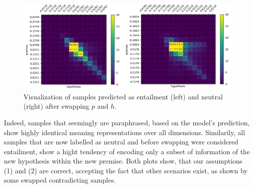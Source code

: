 \begin{figure}[tph!]	\centering
\includegraphics[totalheight=7cm]{fig/alignment_entailment_inversed.png}
	\caption{Visualization of samples predicted as entailment (left) and neutral (right) after swapping $p$ and $h$.}
	\label{fig:alignment_entailment_inversed}
\end{figure}
Indeed, samples that seemingly are paraphrased, based on the model's prediction, show highly identical meaning representations over all dimensions. Similarily, all samples that are now labelled as neutral and before swapping were considered entailment, show a hight tendency of encoding only a subset of information of the new hypothesis within the new premise. Both plots show, that our assumptions (1) and (2) are correct, accepting the fact that other scenarios exist, as shown by some swapped contradicting samples.
